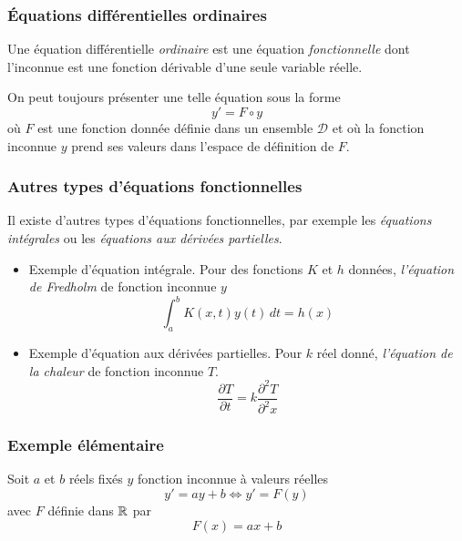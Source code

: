 
\lstset{language=Python,frame=single}

\begin{frame}
  \frametitle{\'Equations différentielles ordinaires}
Une équation différentielle \emph{ordinaire} est une équation \emph{fonctionnelle} dont l'inconnue est une fonction dérivable d'une seule variable réelle.

On peut toujours présenter une telle équation sous la forme
\begin{equation}
  y' = F\circ y
  \label{gene}
\end{equation}
où $F$ est une fonction donnée définie dans un ensemble $\mathcal{D}$ et où la fonction inconnue $y$ prend ses valeurs dans l'espace de définition de $F$.
\end{frame}

\begin{frame}
  \frametitle{Autres types d'équations fonctionnelles}
Il existe d'autres types d'équations fonctionnelles, par exemple les \emph{équations intégrales} ou les \emph{équations aux dérivées partielles}. 
\begin{itemize}
  \item Exemple d'équation intégrale. Pour des fonctions $K$ et $h$ données, \emph{l'équation de Fredholm} de fonction inconnue $y$ 
\begin{equation}
  \int_{a}^{b}K(x,t)y(t)\,dt = h(x)
  \label{fredholm}
\end{equation}
  \item Exemple d'équation aux dérivées partielles. Pour $k$ réel donné, \emph{l'équation de la chaleur} de fonction inconnue $T$.
\begin{displaymath}
  \frac{\partial T}{\partial t} = k\frac{\partial^2 T}{\partial^2 x}
  \label{chaleur}
\end{displaymath}
\end{itemize}
\end{frame}

\begin{frame}
  \frametitle{Exemple élémentaire}
  Soit $a$ et $b$ réels fixés $y$ fonction inconnue à valeurs réelles
  \begin{displaymath}
    y' = a y + b \Leftrightarrow y' = F(y)
  \end{displaymath}
avec $F$ définie dans $\mathbb{R}$ par 
\begin{displaymath}
  F(x) = ax + b
\end{displaymath}
\end{frame}

